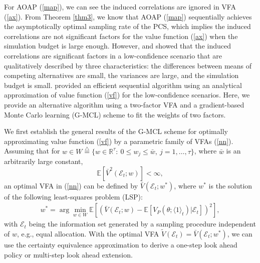 \documentclass[journal]{IEEEtran}
\newcommand{\ed}{\stackrel{\triangle}{=}}
\begin{document}
  For AOAP (\ref{map}), we can see the induced correlations are ignored in VFA (\ref{ax}). From Theorem \ref{thm3}, we know that AOAP (\ref{map}) sequentially achieves the asymptotically optimal sampling rate of the PCS, which implies the induced correlations are not significant factors for the  value function (\ref{ax}) when the simulation budget is large enough. However, \cite{peng2015nonmonotone} and \cite{peng2016gradient} showed that the induced correlations are significant factors in a low-confidence scenario that are qualitatively described by three characteristics: the differences between means of competing alternatives are small, the variances are large, and the simulation budget is small.  
  \cite{peng2016gradient} provided an efficient sequential algorithm using an analytical approximation of value function (\ref{vf}) for the low-confidence scenarios. Here, we provide an alternative algorithm using a two-factor VFA and a gradient-based Monte Carlo learning (G-MCL) scheme to fit the weights of two factors.
  
  We first establish the general results of the G-MCL scheme for optimally approximating value function (\ref{vf}) by a parametric family of VFAs (\ref{nn}).  Assuming that for $w\in W\ed\{ w\in\mathbb{R}^{\tau}:~ 0\leq w_j\leq \bar{w},~j=1,\ldots,\tau \}$, where  $\bar{w}$ is an arbitrarily large constant, 
        $$\mathbb{E}\left[\bar{V}^2(\mathcal{E}_t;w) \right]<\infty,$$
  an optimal VFA in (\ref{nn}) can be defined by $\bar{V}(\mathcal{E}_t;w^{*})$, where $w^{*}$ is the solution of the following  least-squares problem (LSP):
    \begin{align}\label{op1}
   w^{*}=\arg\min_{w\in W} \mathbb{E}\left[ \left(\bar{V}(\mathcal{E}_t;w)-\mathbb{E}[V_P(\theta;\langle 1 \rangle_t)| \mathcal{E}_t]\right)^2\right],
    \end{align}
   with  $\mathcal{E}_t$ being the information set generated by a sampling procedure independent of $w$, e.g., equal allocation.
        With the optimal VFA $\widetilde{V}(\mathcal{E}_t)=\bar{V}(\mathcal{E}_t;w^{*})$, we can use the certainty equivalence approximation to derive a one-step look ahead policy or multi-step look ahead extension. 
      
\end{document}
